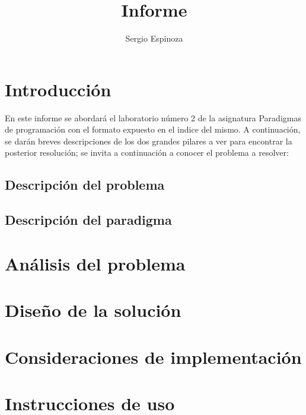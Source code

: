 \documentclass[10pt,letterpaper,openany]{article}
\title{Informe}
\author{Sergio Espinoza}
\begin{document}
    
    
    \tableofcontents
    \listoftables
    \newpage


    \section{Introducción}
    En este informe se abordará el laboratorio número 2 de la asignatura Paradigmas de programación
    con el formato expuesto en el indice del mismo. A continuación, se darán breves descripciones
    de los dos grandes pilares a ver para encontrar la posterior resolución; se invita a continuación
    a conocer el problema a resolver:  
        \subsection{Descripción del problema}
            
        \subsection{Descripción del paradigma}
            

    
    \section{Análisis del problema}
        

    \section{Diseño de la solución}\label{sec:diseño}
        

    \section{Consideraciones de implementación}
        

    \section{Instrucciones de uso}
        
\end{document}
